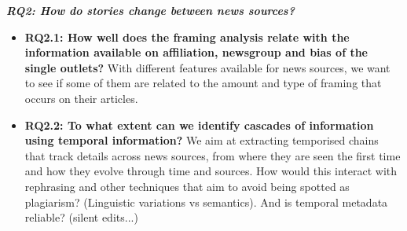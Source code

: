 \vspace{12px}

\textit{\textbf{RQ2: How do stories change between news sources?}}

\vspace{12px}

\begin{itemize}
    \item \textbf{RQ2.1: How well does the framing analysis relate with the information available on affiliation, newsgroup and bias of the single outlets?} With different features available for news sources, we want to see if some of them are related to the amount and type of framing that occurs on their articles.
    
    \item \textbf{RQ2.2: To what extent can we identify cascades of information using temporal information?} We aim at extracting temporised chains that track details across news sources, from where they are seen the first time and how they evolve through time and sources. How would this interact with rephrasing and other techniques that aim to avoid being spotted as plagiarism? (Linguistic variations vs semantics). And is temporal metadata reliable? (silent edits...)
    
    
    
\end{itemize}